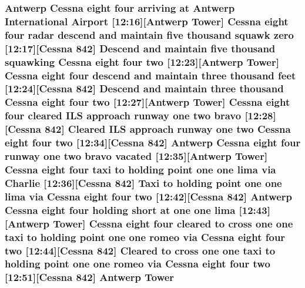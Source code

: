 \subsubsection[{\texorpdfstring{Tower}{Tower}}]{\setlength{\rightskip}{0pt plus 5cm}Antwerp {\bf Cessna} eight four arriving at Antwerp International {\bf Airport} \mbox{[}12\+:16\mbox{]}\mbox{[}Antwerp Tower\mbox{]} {\bf Cessna} eight four radar descend and maintain five {\bf thousand} squawk {\bf zero} \mbox{[}12\+:17\mbox{]}\mbox{[}{\bf Cessna} 842\mbox{]} Descend and maintain five {\bf thousand} {\bf squawking} {\bf Cessna} eight four {\bf two} \mbox{[}12\+:23\mbox{]}\mbox{[}Antwerp Tower\mbox{]} {\bf Cessna} eight four descend and maintain three {\bf thousand} {\bf feet} \mbox{[}12\+:24\mbox{]}\mbox{[}{\bf Cessna} 842\mbox{]} Descend and maintain three {\bf thousand} {\bf Cessna} eight four {\bf two} \mbox{[}12\+:27\mbox{]}\mbox{[}Antwerp Tower\mbox{]} {\bf Cessna} eight four cleared I\+LS approach runway {\bf one} {\bf two} {\bf bravo} \mbox{[}12\+:28\mbox{]}\mbox{[}{\bf Cessna} 842\mbox{]} Cleared I\+LS approach runway {\bf one} {\bf two} {\bf Cessna} eight four {\bf two} \mbox{[}12\+:34\mbox{]}\mbox{[}{\bf Cessna} 842\mbox{]} Antwerp {\bf Cessna} eight four runway {\bf one} {\bf two} {\bf bravo} vacated \mbox{[}12\+:35\mbox{]}\mbox{[}Antwerp Tower\mbox{]} {\bf Cessna} eight four taxi to holding point {\bf one} {\bf one} {\bf lima} via {\bf Charlie} \mbox{[}12\+:36\mbox{]}\mbox{[}{\bf Cessna} 842\mbox{]} Taxi to holding point {\bf one} {\bf one} {\bf lima} via {\bf Cessna} eight four {\bf two} \mbox{[}12\+:42\mbox{]}\mbox{[}{\bf Cessna} 842\mbox{]} Antwerp {\bf Cessna} eight four holding short at {\bf one} {\bf one} {\bf lima} \mbox{[}12\+:43\mbox{]}\mbox{[}Antwerp Tower\mbox{]} {\bf Cessna} eight four cleared to cross {\bf one} {\bf one} taxi to holding point {\bf one} {\bf one} {\bf romeo} via {\bf Cessna} eight four {\bf two} \mbox{[}12\+:44\mbox{]}\mbox{[}{\bf Cessna} 842\mbox{]} Cleared to cross {\bf one} {\bf one} taxi to holding point {\bf one} {\bf one} {\bf romeo} via {\bf Cessna} eight four {\bf two} \mbox{[}12\+:51\mbox{]}\mbox{[}{\bf Cessna} 842\mbox{]} Antwerp Tower}\hypertarget{happyDay3ATC_8txt_ace630024e4273db10ace0d1c52442b81}{}\label{happyDay3ATC_8txt_ace630024e4273db10ace0d1c52442b81}
